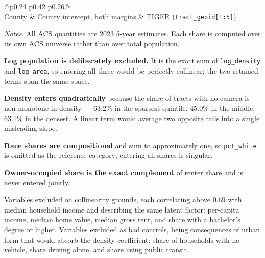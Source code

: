\begin{table}[htbp]
\begin{tabular}{@{}p{} p{} p{}@{}}
 \\
\addlinespace
County & County intercept, both margins & TIGER (\texttt{tract\_geoid[1:5]}) \\
\bottomrule
\end{tabular}

\vspace{0.6em}
\begin{minipage}{\textwidth}
\footnotesize
\textit{Notes.} All ACS quantities are 2023 5-year estimates. Each share is
computed over its own ACS universe rather than over total population.

\textbf{Log population is deliberately excluded.} It is the exact sum of
\texttt{log\_density} and \texttt{log\_area}, so entering all three would be
perfectly collinear; the two retained terms span the same space.

\textbf{Density enters quadratically} because the share of tracts with no
camera is non-monotone in density --- 63.2\% in the sparsest quintile, 45.0\%
in the middle, 63.1\% in the densest. A linear term would average two opposite
tails into a single misleading slope.

\textbf{Race shares are compositional} and sum to approximately one, so
\texttt{pct\_white} is omitted as the reference category; entering all shares
is singular.

\textbf{Owner-occupied share is the exact complement} of renter share and is
never entered jointly.

Variables excluded on collinearity grounds, each correlating above $0.69$ with
median household income and describing the same latent factor: per-capita
income, median home value, median gross rent, and share with a bachelor's
degree or higher. Variables excluded as bad controls, being consequences of
urban form that would absorb the density coefficient: share of households with
no vehicle, share driving alone, and share using public transit.
\end{minipage}
\end{table}
